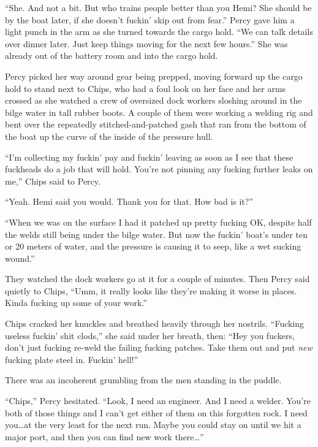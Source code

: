 \documentclass[
]{scrbook}
\begin{document}
``She. And not a bit. But who trains people better than you Hemi? She
should be by the boat later, if she doesn't fuckin' skip out from
fear.'' Percy gave him a light punch in the arm as she turned towards
the cargo hold. ``We can talk details over dinner later. Just keep
things moving for the next few hours.'' She was already out of the
battery room and into the cargo hold.

\bigskip

Percy picked her way around gear being prepped, moving forward up the
cargo hold to stand next to Chips, who had a foul look on her face and
her arms crossed as she watched a crew of oversized dock workers
sloshing around in the bilge water in tall rubber boots. A couple of
them were working a welding rig and bent over the repeatedly
stitched-and-patched gash that ran from the bottom of the boat up the
curve of the inside of the pressure hull.

``I'm collecting my fuckin' pay and fuckin' leaving as soon as I see
that these fuckheads do a job that will hold. You're not pinning any
fucking further leaks on me,'' Chips said to Percy.

``Yeah. Hemi said you would. Thank you for that. How bad is it?''

``When we was on the surface I had it patched up pretty fucking OK,
despite half the welds still being under the bilge water. But now the
fuckin' boat's under ten or 20 meters of water, and the pressure is
causing it to seep, like a wet sucking wound.''

They watched the dock workers go at it for a couple of minutes. Then
Percy said quietly to Chips, ``Umm, it really looks like they're making
it worse in places. Kinda fucking up some of your work.''

Chips cracked her knuckles and breathed heavily through her nostrils.
``Fucking useless fuckin' shit clods,'' she said under her breath, then:
``Hey you fuckers, don't just fucking re-weld the failing fucking
patches. Take them out and put \emph{new} fucking plate steel in.
Fuckin' hell!''

There was an incoherent grumbling from the men standing in the puddle.

``Chips,'' Percy hesitated. ``Look, I need an engineer. And I need a
welder. You're both of those things and I can't get either of them on
this forgotten rock. I need you\ldots at the very least for the next
run. Maybe you could stay on until we hit a major port, and then you can
find new work there\ldots{}''
\end{document}
